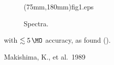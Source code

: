 \documentclass{pasj00}
\begin{document}
\begin{figure}
\FigureFile(75mm,180mm){fig1.eps}
\caption{Spectra.}
\end{figure}
with $\lesssim 5\,\MO$ accuracy, as  found ().
\begin{thebibliography}{}
 Makishima, K., et al.\ 1989
\end{thebibliography}
\end{document}

